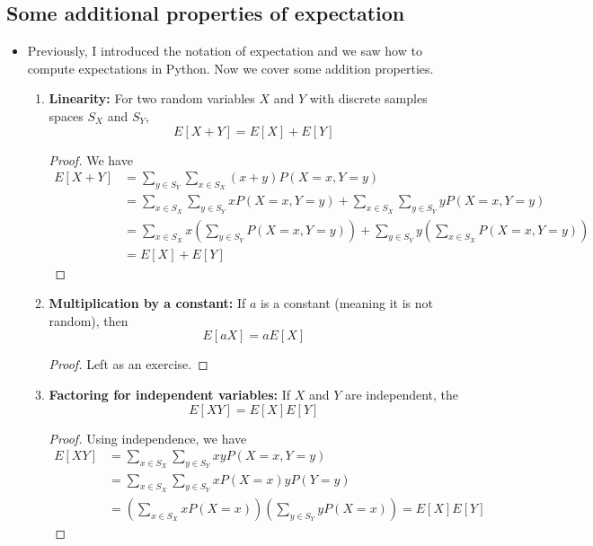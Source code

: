   \subsection{Some additional properties of expectation}
  \begin{itemize}
   \label{prop:lin}\item Previously, I introduced the notation of expectation and we saw how to compute expectations in Python. Now we cover some addition properties. 
  \begin{enumerate}
  \item {\bf Linearity:} For two random variables $X$ and $Y$ with discrete samples spaces $S_X$ and $S_Y$, 
  \begin{equation*}
  E[X+Y] = E[X]+E[Y]
  \end{equation*}
  \begin{proof} We have 
  \begin{align*}
  E[X+Y] &= \sum_{y \in S_Y}\sum_{x\in S_X} (x+y)P(X=x,Y=y) \\
  &= \sum_{x \in S_X} \sum_{y \in S_Y} xP(X=x,Y=y)  +  \sum_{x \in S_X} \sum_{y \in S_Y} yP(X=x,Y=y) \\
  &= \sum_{x \in S_X} x\left( \sum_{y \in S_Y}P(X=x,Y=y)  \right)+   \sum_{y \in S_Y} y\left( \sum_{x \in S_X} P(X=x,Y=y)\right) \\
  &= E[X] + E[Y]
  \end{align*}
  \end{proof}
    \item {\bf Multiplication by a constant:} If $a$ is a constant (meaning it is not random), then 
    \begin{equation*}
      E[aX] =  a E[X]
    \end{equation*}
     \begin{proof}  Left as an exercise. 
     \end{proof}
  \item \label{prop:ind}  {\bf Factoring for independent variables:} If $X$ and $Y$ are independent, the 
  \begin{equation*}
  E[XY]=E[X]E[Y]
  \end{equation*}
    \begin{proof} Using independence, we have 
    \begin{align*}
     E[XY] &= \sum_{x \in S_X}\sum_{y \in S_Y} xy P(X=x,Y=y)  \\
     &= \sum_{x \in S_X}\sum_{y \in S_Y} xP(X=x)yP(Y=y) \\
     &= \left( \sum_{x \in S_X} xP(X=x)\right)\left( \sum_{y \in S_Y} yP(X=x)\right)= E[X]E[Y]

\end{align*}
\end{proof}
\end{enumerate}
\end{itemize}
